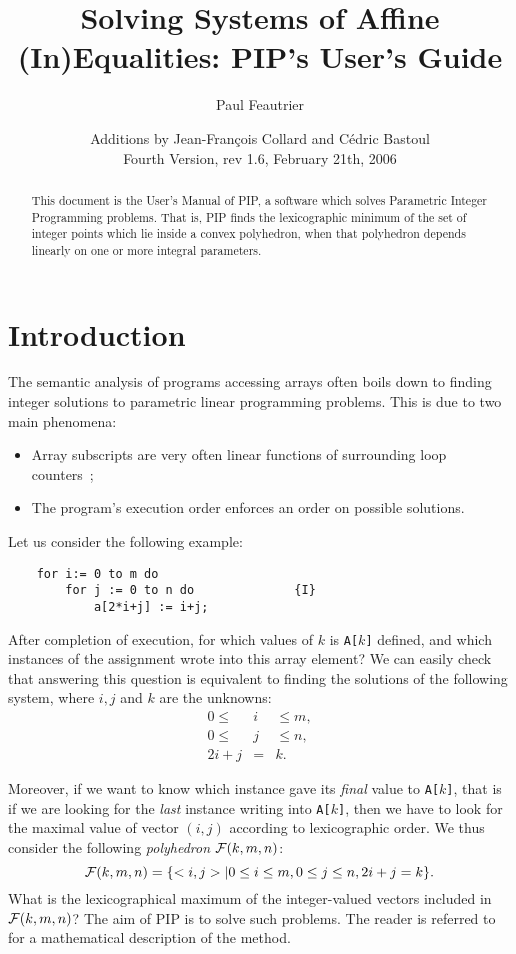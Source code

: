 \documentclass[12pt,a4paper,dvips]{article}
\date{Additions by Jean-Fran\c{c}ois Collard and C\'edric Bastoul\\
Fourth Version, rev 1.6, February 21th, 2006}
\title{Solving Systems of Affine (In)Equalities: PIP's User's Guide}
\author{Paul Feautrier}
\begin{document}
\pagestyle{headings}

\maketitle


\begin{abstract}
This document is the User's Manual of PIP, a software which solves
Parametric Integer Programming problems. That is, PIP finds the
lexicographic minimum of the set of integer points which lie inside a
convex polyhedron, when that polyhedron depends linearly on one or
more integral parameters. 
\end{abstract}

\section{Introduction}
The semantic analysis of programs accessing arrays often boils down
to finding integer solutions to parametric linear programming problems. This is
due to two main phenomena:
\begin{itemize}
\item Array subscripts are very often linear functions of surrounding loop counters~;
\item The program's execution order enforces an order on possible solutions.
\end{itemize}

Let us consider the following example:
\begin{verbatim}
    for i:= 0 to m do
        for j := 0 to n do              {I}
            a[2*i+j] := i+j;
\end{verbatim}

After completion of execution, for which values of $k$ is {\tt A[}$k${\tt ]}
defined, and which instances of the assignment wrote into
this array element? We can easily check that answering this question
is equivalent to finding the solutions of the following system, where $i,
j$ and $k$ are the unknowns:
\begin{eqnarray}
0 \leq & i & \leq m ,\\
0 \leq & j & \leq n ,\\
2i + j & = & k .
\end{eqnarray}

Moreover, if we want to know which instance gave its {\em final} value
to {\tt A[}$k${\tt ]}, that is if we are looking for the {\em last} instance
writing into {\tt A[}$k${\tt ]}, then we have to look for the maximal value
of vector $(i,j)$ according to lexicographic order. We
thus consider the following {\em polyhedron} ${\cal F}(k, m, n) $:
\begin{equation}
{\cal F}(k, m, n) = \{<i, j>| 0 \leq i \leq m, 0 \leq j \leq n, 2i+j = k\} .
\label{exp1}
\end{equation}
What is the lexicographical maximum of the 
integer-valued vectors included in ${\cal F}(k, m, n)$?
The aim of PIP is to solve such problems. The reader is referred to
\cite{Feau:88b} for a mathematical description of the method.
%
%
\end{document}
